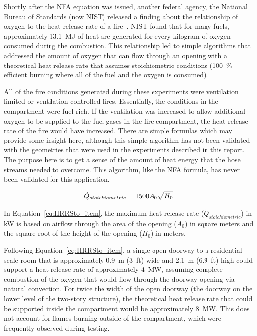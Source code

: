\documentclass[12pt,oneside]{book}
\begin{document}
Shortly after the NFA equation was issued, another federal agency, the National Bureau of Standards (now NIST) released a finding about the relationship of oxygen to the heat release rate of a fire~\cite{Babrauskas:3}. NIST found that for many fuels, approximately 13.1~MJ of heat are generated for every kilogram of oxygen consumed during the combustion. This relationship led to simple algorithms that addressed the amount of oxygen that can flow through an opening with a theoretical heat release rate that assumes stoichiometric conditions (100~\% efficient burning where all of the fuel and the oxygen is consumed).

All of the fire conditions generated during these experiments were ventilation limited or ventilation controlled fires. Essentially, the conditions in the compartment were fuel rich. If the ventilation was increased to allow additional oxygen to be supplied to the fuel gases in the fire compartment, the heat release rate of the fire would have increased. There are simple formulas which may provide some insight here, although this simple algorithm has not been validated with the geometries that were used in the experiments described in this report. The purpose here is to get a sense of the amount of heat energy that the hose streams needed to overcome. This algorithm, like the NFA formula, has never been validated for this application.  

\begin{equation} \label{eq:HRRSto_item}
\dot{Q}_{stoichiometric} = 1500 A_0 \sqrt{H_0} \\
\end{equation}

In Equation~\ref{eq:HRRSto_item}, the maximum heat release rate ($\dot{Q}_{stoichiometric}$) in kW is based on airflow through the area of the opening ($A_0$) in square meters and the square root of the height of the opening ($H_0$) in meters.  

Following Equation~\ref{eq:HRRSto_item}, a single open doorway to a residential scale room that is approximately 0.9~m (3~ft) wide and 2.1~m (6.9~ft) high could support a heat release rate of approximately 4~MW, assuming complete combustion of the oxygen that would flow through the doorway opening via natural convection. For twice the width of the open doorway (the doorway on the lower level of the two-story structure), the theoretical heat release rate that could be supported inside the compartment would be approximately 8~MW. This does not account for flames burning outside of the compartment, which were frequently observed during testing.  
\end{document}
